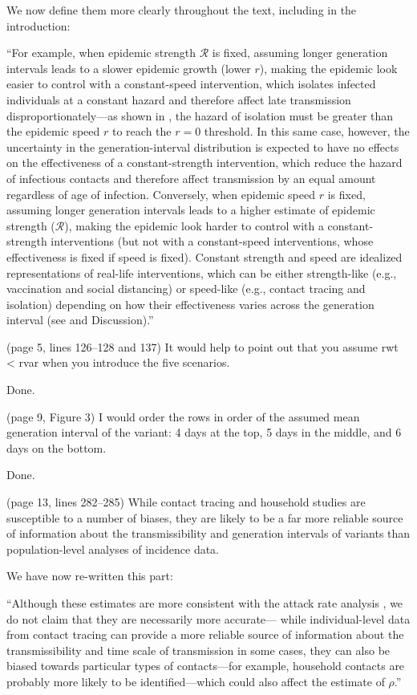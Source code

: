 \documentclass[12pt]{article}
\newcommand{\RR}{\ensuremath{{\mathcal R}}\xspace}
\newcommand{\revtext}{\textsf}
\begin{document}
We now define them more clearly throughout the text, including in the introduction:

``For example, when epidemic strength $\RR$ is fixed, assuming longer generation intervals leads to a slower epidemic growth (lower $r$), making the epidemic look easier to control with a constant-speed intervention, which isolates infected individuals at a constant hazard and therefore affect late transmission disproportionately---as shown in \cite{doi:10.1098/rspb.2020.1556}, the hazard of isolation must be greater than the epidemic speed $r$ to reach the $r=0$ threshold.
In this same case, however, the uncertainty in the generation-interval distribution is expected to have no effects on the effectiveness of a constant-strength intervention, which reduce the hazard of infectious contacts and therefore affect transmission by an equal amount regardless of age of infection.
Conversely, when epidemic speed $r$ is fixed, assuming longer generation intervals leads to a higher estimate of epidemic strength ($\RR$), making the epidemic look harder to control with a constant-strength interventions (but not with a constant-speed interventions, whose effectiveness is fixed if speed is fixed).
Constant strength and speed are idealized representations of real-life interventions, which can be either strength-like (e.g., vaccination and social distancing) or speed-like (e.g., contact tracing and isolation) depending on how their effectiveness varies across the generation interval (see \cite{doi:10.1098/rspb.2020.1556} and Discussion).''

\revtext{(page 5, lines 126–128 and 137) It would help to point out that you assume
rwt < rvar when you introduce the five scenarios.}

Done.

\revtext{(page 9, Figure 3) I would order the rows in order of the assumed mean
generation interval of the variant: 4 days at the top, 5 days in the middle,
and 6 days on the bottom.}

Done.

\revtext{(page 13, lines 282–285) While contact tracing and household studies are
susceptible to a number of biases, they are likely to be a far more reliable
source of information about the transmissibility and generation intervals
of variants than population-level analyses of incidence data.}

We have now re-written this part:

``Although these estimates are more consistent with the attack rate analysis \citep{ukinvest},
we do not claim that they are necessarily more accurate---
while individual-level data from contact tracing can provide a more reliable source of information about the transmissibility and time scale of transmission in some cases, they can also be biased towards particular types of contacts---for example, household contacts are probably more likely to be identified---which could also affect the estimate of $\rho$.''
\end{document}
